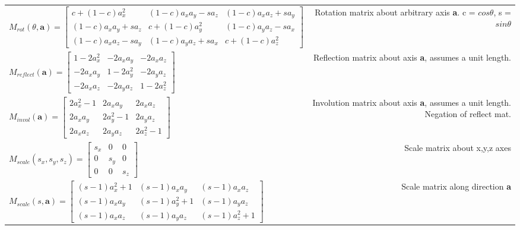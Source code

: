 {\begin{tabulary}{8in}{LR}
$ M_{rot}(\theta, \textbf{a}) = \begin{bmatrix}
c + (1-c)a_x^2 & (1-c)a_x a_y - s a_z & (1-c)a_x a_z + s a_y \\
(1-c)a_x a_y + s a_z & c + (1-c)a_y^2 & (1-c)a_y a_z - s a_x \\
(1-c)a_x a_z - s a_y & (1-c)a_y a_z + s a_x & c + (1-c) a_z^2
\end{bmatrix}
$
& Rotation matrix about arbitrary axis \textbf{a}. c = $cos \theta$, s = $ sin \theta $ \\

$ M_{reflect}(\textbf{a}) = \begin{bmatrix}
1 - 2a_x^2 & -2a_x a_y & -2a_x a_z \\
-2a_x a_y & 1 -2a_y^2 & -2a_y a_z \\
-2a_x a_z & -2a_y a_z & 1 - 2a_z^2
\end{bmatrix}
$
& Reflection matrix about axis \textbf{a}, assumes a unit length. \\

$ M_{invol}(\textbf{a}) = \begin{bmatrix}
2a_x^2 - 1 & 2a_x a_y & 2a_x a_z \\
2a_x a_y & 2a_y^2 - 1 & 2a_y a_z \\
2a_x a_z & 2a_y a_z & 2a_z^2 - 1
\end{bmatrix}
$
& Involution matrix about axis \textbf{a}, assumes a unit length. Negation of reflect mat.\\

$ M_{scale}(s_x,s_y,s_z) = \begin{bmatrix}
s_x & 0 & 0 \\
0 & s_y & 0 \\
0 & 0 & s_z
\end{bmatrix}
$
& Scale matrix about x,y,z axes \\

$ M_{scale}(s,\textbf{a}) = \begin{bmatrix}
(s-1)a_x^2 + 1 & (s-1)a_x a_y & (s-1) a_x a_z \\
(s-1)a_x a_y & (s-1) a_y^2 + 1 & (s-1)a_y a_z \\
(s-1)a_x a_z & (s-1) a_y a_z & (s-1)a_z^2 + 1
\end{bmatrix}
$
& Scale matrix along direction \textbf{a} \\

\end{tabulary} %
}

